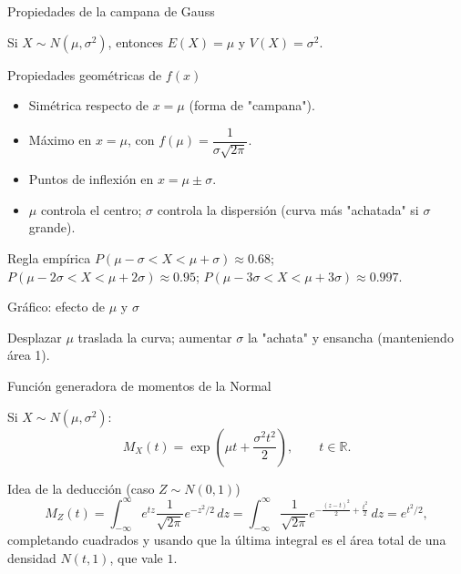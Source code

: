 \documentclass[aspectratio=169,11pt]{beamer}
\begin{document}
\begin{frame}{Propiedades de la campana de Gauss}
\begin{theorem}
Si $X\sim N(\mu,\sigma^2)$, entonces $E(X)=\mu$ y $V(X)=\sigma^2$.
\end{theorem}

\begin{block}{Propiedades geométricas de $f(x)$}
\begin{itemize}
\item Simétrica respecto de $x=\mu$ (forma de "campana").
\item Máximo en $x=\mu$, con $f(\mu) = \dfrac{1}{\sigma\sqrt{2\pi}}$.
\item Puntos de inflexión en $x=\mu\pm\sigma$.
\item $\mu$ controla el centro; $\sigma$ controla la dispersión (curva más "achatada" si $\sigma$ grande).
\end{itemize}
\end{block}

\begin{alertblock}{Regla empírica}
$P(\mu-\sigma<X<\mu+\sigma)\approx 0.68$; \quad $P(\mu-2\sigma<X<\mu+2\sigma)\approx 0.95$; \quad $P(\mu-3\sigma<X<\mu+3\sigma)\approx 0.997$.
\end{alertblock}
\end{frame}

\begin{frame}{Gráfico: efecto de $\mu$ y $\sigma$}
\begin{center}
\end{center}
Desplazar $\mu$ traslada la curva; aumentar $\sigma$ la "achata" y ensancha (manteniendo área 1).
\end{frame}

\begin{frame}{Función generadora de momentos de la Normal}
\begin{theorem}
Si $X\sim N(\mu,\sigma^2)$:
$$M_X(t) = \exp\left(\mu t + \frac{\sigma^2 t^2}{2}\right), \qquad t\in\mathbb{R}.$$
\end{theorem}

\begin{block}{Idea de la deducción (caso $Z\sim N(0,1)$)}
$$M_Z(t) = \int_{-\infty}^\infty e^{tz}\frac{1}{\sqrt{2\pi}}e^{-z^2/2}\,dz = \int_{-\infty}^\infty \frac{1}{\sqrt{2\pi}}e^{-\frac{(z-t)^2}{2}+\frac{t^2}{2}}\,dz = e^{t^2/2},$$
completando cuadrados y usando que la última integral es el área total de una densidad $N(t,1)$, que vale $1$.
\end{block}
\end{frame}
\end{document}
